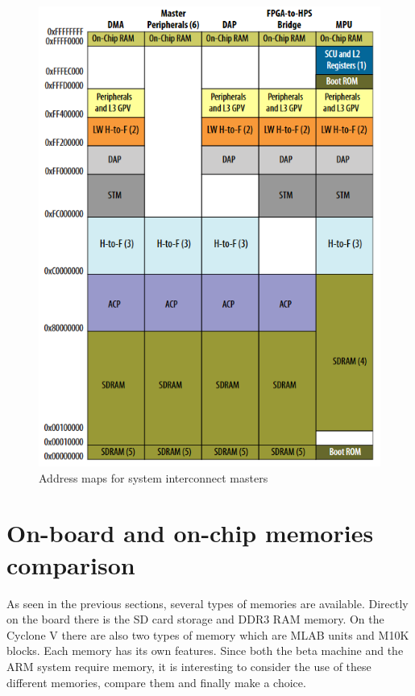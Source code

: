 \begin{figure}[H]
    \centering
    \includegraphics[scale=0.6]{Chapter1-Hardware/res/hps_address_space.PNG}
    \caption{Address maps for system interconnect masters}
    \label{fig:cyc5/address_space}
\end{figure}

\section{On-board and on-chip memories comparison}

As seen in the previous sections, several types of memories are available. Directly on the board 
there is the SD card storage and DDR3 RAM memory. On the Cyclone V there are also two types of memory 
which are MLAB units and M10K blocks. Each memory has its own features. Since both the beta 
machine and the ARM system require memory, it is interesting to consider the use of these different 
memories, compare them and finally make a choice.

